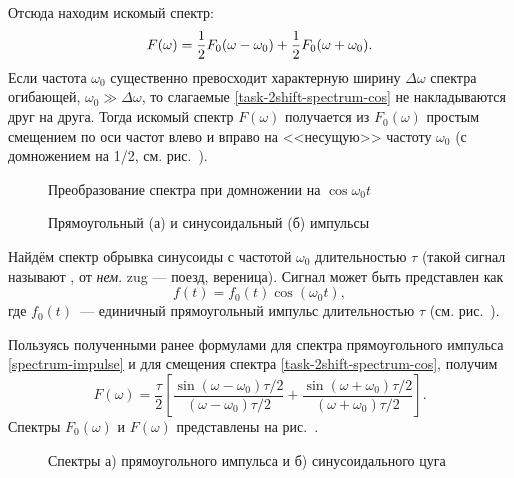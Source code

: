Отсюда находим искомый спектр:
\begin{equation}
    \eqmark{task-2shift-spectrum-cos}
    F(\omega)=\frac{1}{2}F_0(\omega-\omega_0)+\frac{1}{2}F_0(\omega+\omega_0).
\end{equation}
Если частота $\omega_0$ существенно превосходит характерную ширину $\Delta \omega$
спектра огибающей, $\omega_0 \gg \Delta \omega$, то слагаемые
\eqref{task-2shift-spectrum-cos} не накладываются друг на друга.
Тогда искомый спектр $F(\omega)$ получается из $F_0(\omega)$
простым смещением по оси частот влево и вправо на <<несущую>>
частоту $\omega_0$ (с домножением на 1/2, см. рис.~).

\begin{figure}[h!]
\centering{}
    \caption{Преобразование спектра при домножении на $\cos \omega_0 t$}
\end{figure}

\begin{figure}[h!]
    \centering{}
    \caption{\footnotesize Прямоугольный (а) и синусоидальный (б) импульсы}
\end{figure}

\begin{lab:example}\label{example:one-zug}
Найдём спектр обрывка синусоиды с частотой $\omega_0$
длительностью $\tau$ 
(такой сигнал называют , от \textit{нем}. zug --- 
поезд, вереница). Сигнал может быть представлен как
\begin{equation*}f(t)=f_0(t)\cos(\omega_0 t),\end{equation*} где $f_0(t)$~--- 
единичный прямоугольный импульс длительностью $\tau$ (см. рис.~).

Пользуясь полученными ранее формулами для спектра прямоугольного импульса
\eqref{spectrum-impulse} и для смещения спектра \eqref{task-2shift-spectrum-cos},
получим
\begin{equation*}
F(\omega)=\frac{\tau}{2}\left[\frac{\sin(\omega-\omega_0)\tau/2}{
(\omega-\omega_0)\tau/2}+
\frac{\sin(\omega+\omega_0)\tau/2}{(\omega+\omega_0)\tau/2}
\right].
\end{equation*}
Спектры $F_0(\omega)$ и $F(\omega)$ представлены на
рис.~.

\begin{figure}[h!]
\centering{}
    \caption{Спектры а) прямоугольного импульса и б) синусоидального цуга}
\end{figure}
\end{lab:example}

